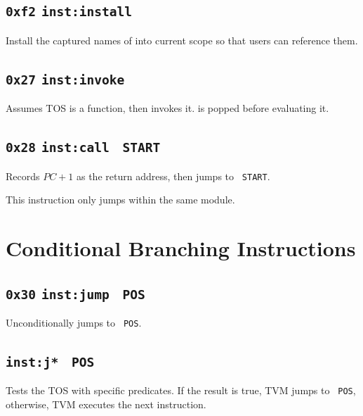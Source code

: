 \documentclass{report}
\newcommand{\mtilde}[1]{\textasciitilde}
\newcommand{\marg}[1]{\texttt{\mtilde ~#1}}
\newcommand{\inst}[1] {\texttt{inst:#1}}
\begin{document}
\subsection{\texttt{0xf2} \inst{install} }

Install the captured names of  into current scope so that users can reference them.

\subsection{\texttt{0x27} \inst{invoke} }

Assumes TOS is a function, then invokes it.  is popped before evaluating it.

\subsection{\texttt{0x28} \inst{call} \marg{START}}

Records $PC + 1$ as the return address, then jumps to \marg{START}.

\begin{mdframed}[style=hint]
  This instruction only jumps within the same module.
\end{mdframed}

\section{Conditional Branching Instructions}

\subsection{\texttt{0x30} \inst{jump} \marg{POS}}

Unconditionally jumps to \marg{POS}.

\subsection{\inst{j*} \marg{POS} }

Tests the TOS with specific predicates. If the result is true, TVM jumps to \marg{POS}, otherwise, TVM executes the next instruction.
\end{document}

